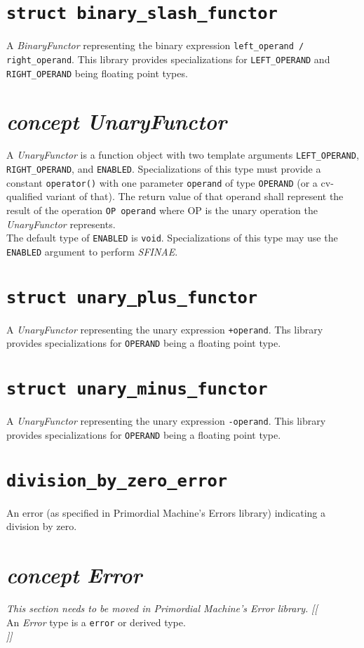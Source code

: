 \documentclass[oneside]{report}
\begin{document}
\section{\texttt{struct binary\_slash\_functor}}
A \textit{BinaryFunctor} representing the binary expression \verb|left_operand / right_operand|.
This library provides specializations for \texttt{LEFT\_OPERAND} and \texttt{RIGHT\_OPERAND} being floating point types.

\section{\textit{concept UnaryFunctor}}
A \textit{UnaryFunctor} is a function object with two template arguments \verb+LEFT_OPERAND+,
\verb+RIGHT_OPERAND+, and \verb+ENABLED+. Specializations of this type must provide a
constant \verb+operator()+ with one parameter \verb+operand+ of type \verb+OPERAND+
(or a cv-qualified variant of that). The return value of that operand shall represent the
result of the operation \verb+OP operand+ where OP is the unary operation
the \textit{UnaryFunctor} represents.\\

\noindent{}The default type of \verb+ENABLED+ is \verb+void+. Specializations of this type may use
the \verb+ENABLED+ argument to perform \textit{SFINAE}.

\section{\texttt{struct unary\_plus\_functor}}
A \textit{UnaryFunctor} representing the unary expression \verb|+operand|.
Ths library provides specializations for \texttt{OPERAND} being a floating point type.

\section{\texttt{struct unary\_minus\_functor}}
A \textit{UnaryFunctor} representing the unary expression \verb|-operand|.
This library provides specializations for \texttt{OPERAND} being a floating point type.

\section{\texttt{division\_by\_zero\_error}}
An error (as specified in Primordial Machine's Errors library) indicating a division by zero.

\section{\textit{concept Error}}
\textit{\color{orange}This section needs to be moved in Primordial Machine's Error library.}
\noindent\textit{\color{orange}[[}\\
An \textit{Error} type is a \texttt{error} or derived type.\\
\noindent\textit{\color{orange}]]}
\end{document}
